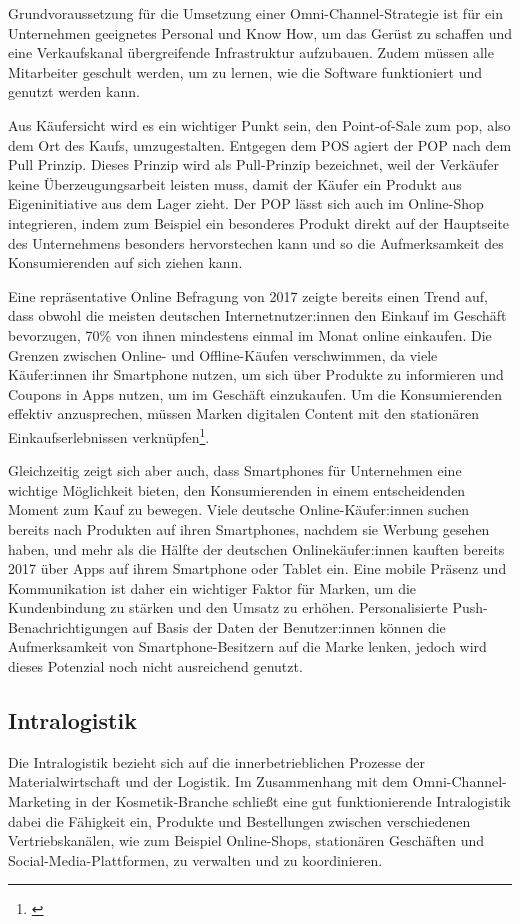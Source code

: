Grundvoraussetzung für die Umsetzung einer Omni-Channel-Strategie ist für ein Unternehmen geeignetes Personal und Know How, um das Gerüst zu schaffen und eine Verkaufskanal übergreifende Infrastruktur aufzubauen. Zudem müssen alle Mitarbeiter geschult werden, um zu lernen, wie die Software funktioniert und genutzt werden kann.
\newline

Aus Käufersicht wird es ein wichtiger Punkt sein, den Point-of-Sale zum \ac{pop}, also dem Ort des Kaufs, umzugestalten. Entgegen dem POS agiert der POP nach dem Pull Prinzip. Dieses Prinzip wird als Pull-Prinzip bezeichnet, weil der Verkäufer keine Überzeugungsarbeit leisten muss, damit der Käufer ein Produkt aus Eigeninitiative aus dem Lager zieht. Der POP lässt sich auch im Online-Shop integrieren, indem zum Beispiel ein besonderes Produkt direkt auf der Hauptseite des Unternehmens besonders hervorstechen kann und so die Aufmerksamkeit des Konsumierenden auf sich ziehen kann.
\newline

Eine repräsentative Online Befragung von 2017 zeigte bereits einen Trend auf, dass obwohl die meisten deutschen Internetnutzer:innen den Einkauf im Geschäft bevorzugen, 70\% von ihnen mindestens einmal im Monat online einkaufen. Die Grenzen zwischen Online- und Offline-Käufen verschwimmen, da viele Käufer:innen ihr Smartphone nutzen, um sich über Produkte zu informieren und Coupons in Apps nutzen, um im Geschäft einzukaufen. Um die Konsumierenden effektiv anzusprechen, müssen Marken digitalen Content mit den stationären Einkaufserlebnissen verknüpfen\footnote{\autocite [Online] {Ipsos2017}}.
\newline

Gleichzeitig zeigt sich aber auch, dass Smartphones für Unternehmen eine wichtige Möglichkeit bieten, den Konsumierenden in einem entscheidenden Moment zum Kauf zu bewegen. Viele deutsche Online-Käufer:innen suchen bereits nach Produkten auf ihren Smartphones, nachdem sie Werbung gesehen haben, und mehr als die Hälfte der deutschen Onlinekäufer:innen kauften bereits 2017 über Apps auf ihrem Smartphone oder Tablet ein. Eine mobile Präsenz und Kommunikation ist daher ein wichtiger Faktor für Marken, um die Kundenbindung zu stärken und den Umsatz zu erhöhen. Personalisierte Push-Benachrichtigungen auf Basis der Daten der Benutzer:innen können die Aufmerksamkeit von Smartphone-Besitzern auf die Marke lenken, jedoch wird dieses Potenzial noch nicht ausreichend genutzt.
\subsection{Intralogistik}\label{unterabschnitt_3_6}
Die Intralogistik bezieht sich auf die innerbetrieblichen Prozesse der Materialwirtschaft und der Logistik. Im Zusammenhang mit dem Omni-Channel-Marketing in der Kosmetik-Branche schließt eine gut funktionierende Intralogistik dabei die Fähigkeit ein, Produkte und Bestellungen zwischen verschiedenen Vertriebskanälen, wie zum Beispiel Online-Shops, stationären Geschäften und Social-Media-Plattformen, zu verwalten und zu koordinieren.
\newline


